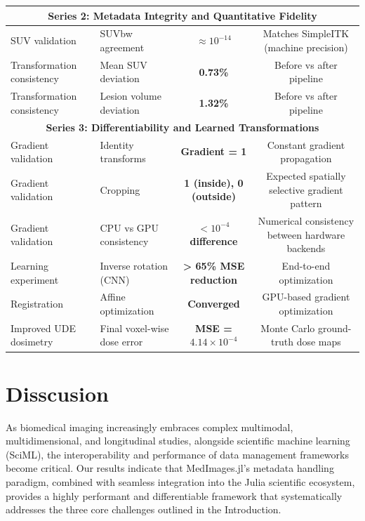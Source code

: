 \documentclass[a4paper,10pt]{elsarticle}
\begin{document}
\begin{table}[H]
\begin{tabular}{|l|l|c|c|}
\multicolumn{4}{|c|}{\textbf{Series 2: Metadata Integrity and Quantitative Fidelity}} \\
\hline
SUV validation & SUVbw agreement & \textbf{$\approx 10^{-14}$} & Matches SimpleITK (machine precision) \\
Transformation consistency & Mean SUV deviation & \textbf{0.73\%} & Before vs after pipeline \\
Transformation consistency & Lesion volume deviation & \textbf{1.32\%} & Before vs after pipeline \\
\hline
\multicolumn{4}{|c|}{\textbf{Series 3: Differentiability and Learned Transformations}} \\
\hline
Gradient validation & Identity transforms & \textbf{Gradient = 1} & Constant gradient propagation \\
Gradient validation & Cropping & \textbf{1 (inside), 0 (outside)} & Expected spatially selective gradient pattern\\
Gradient validation & CPU vs GPU consistency & \textbf{$< 10^{-4}$ difference} & Numerical consistency between hardware backends\\
Learning experiment & Inverse rotation (CNN) & \textbf{> 65\% MSE reduction} & End-to-end optimization\\
Registration & Affine optimization & \textbf{Converged} & GPU-based gradient optimization \\
Improved UDE dosimetry & Final voxel-wise dose error & \textbf{MSE = $4.14 \times 10^{-4}$} & Monte Carlo ground-truth dose maps\\
\hline
\end{tabular}
\end{table}

\section{ Disscusion}

As biomedical imaging increasingly embraces complex multimodal, multidimensional, and longitudinal studies, alongside scientific machine learning (SciML), the interoperability and performance of data management frameworks become critical. Our results indicate that MedImages.jl’s metadata handling paradigm, combined with seamless integration into the Julia scientific ecosystem, provides a highly performant and differentiable framework that systematically addresses the three core challenges outlined in the Introduction.  
\end{document}
